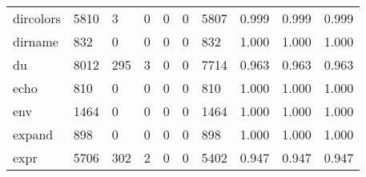 \begin{longtable}{lp{2.0cm}p{2.0cm}p{2.0cm}p{2.0cm}p{2.0cm}p{2.0cm}p{2.0cm}p{2.0cm}p{2.0cm}}
dircolors &                   5810 &                                  3 &                                 0 &                                0 &                                 0 &                            5807 &                                   0.999 &                                  0.999 &                                0.999 \\
dirname   &                    832 &                                  0 &                                 0 &                                0 &                                 0 &                             832 &                                   1.000 &                                  1.000 &                                1.000 \\
du        &                   8012 &                                295 &                                 3 &                                0 &                                 0 &                            7714 &                                   0.963 &                                  0.963 &                                0.963 \\
echo      &                    810 &                                  0 &                                 0 &                                0 &                                 0 &                             810 &                                   1.000 &                                  1.000 &                                1.000 \\
env       &                   1464 &                                  0 &                                 0 &                                0 &                                 0 &                            1464 &                                   1.000 &                                  1.000 &                                1.000 \\
expand    &                    898 &                                  0 &                                 0 &                                0 &                                 0 &                             898 &                                   1.000 &                                  1.000 &                                1.000 \\
expr      &                   5706 &                                302 &                                 2 &                                0 &                                 0 &                            5402 &                                   0.947 &                                  0.947 &                                0.947 \\

\end{longtable}
